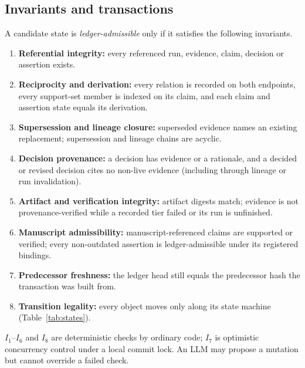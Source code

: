 \documentclass[journal]{IEEEtran}
\begin{document}
\subsection{Invariants and transactions}
\label{sec:txn}
A candidate state is \emph{ledger-admissible} only if it satisfies the following invariants.
\begin{enumerate}
    \item[$I_1$] \textbf{Referential integrity:} every referenced run, evidence, claim, decision or assertion exists.
    \item[$I_2$] \textbf{Reciprocity and derivation:} every relation is recorded on both endpoints, every support-set member is indexed on its claim, and each claim and assertion state equals its derivation.
    \item[$I_3$] \textbf{Supersession and lineage closure:} superseded evidence names an existing replacement; supersession and lineage chains are acyclic.
    \item[$I_4$] \textbf{Decision provenance:} a decision has evidence or a rationale, and a decided or revised decision cites no non-live evidence (including through lineage or run invalidation).
    \item[$I_5$] \textbf{Artifact and verification integrity:} artifact digests match; evidence is not provenance-verified while a recorded tier failed or its run is unfinished.
    \item[$I_6$] \textbf{Manuscript admissibility:} manuscript-referenced claims are supported or verified; every non-outdated assertion is ledger-admissible under its registered bindings.
    \item[$I_7$] \textbf{Predecessor freshness:} the ledger head still equals the predecessor hash the transaction was built from.
    \item[$I_8$] \textbf{Transition legality:} every object moves only along its state machine (Table~\ref{tab:states}).
\end{enumerate}
$I_1$--$I_6$ and $I_8$ are deterministic checks by ordinary code; $I_7$ is optimistic concurrency control under a local commit lock. An LLM may propose a mutation but cannot override a failed check.
\end{document}
